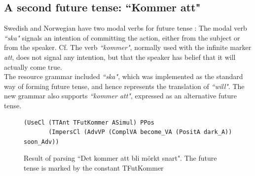 \documentclass{report}
\begin{document}

\subsection{A second future tense: ``Kommer att"}
Swedish and Norwegian have two modal verbs for future tense
\cite[p. 246]{H&H}:
The modal verb \emph{``ska"} signals an intention of committing the action, either from the subject or from
the speaker. Cf.
The verb \emph{``kommer"}, normally used with the infinite marker \emph{att},
does not signal any intention, but that the speaker has belief that 
it will actually come true.\\
The resource grammar included 
\emph{``ska"}, which was implemented as the standard way of forming future
tense, and hence represents the translation of
\emph{``will"}. 
The new grammar also supports \emph{``kommer att"}, expressed as an alternative
future tense.
\begin{figure}[h]
\begin{verbatim}
(UseCl (TTAnt TFutKommer ASimul) PPos 
       (ImpersCl (AdvVP (ComplVA become_VA (PositA dark_A)) soon_Adv))
\end{verbatim}
\caption{Result of parsing ``Det kommer att bli mörkt snart". The future tense
         is marked by the constant TFutKommer}
  \label{fig:kommeratt}
\end{figure}
\end{document}
